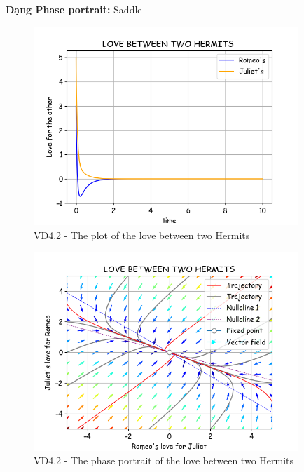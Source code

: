 \textbf{Dạng Phase portrait: } Saddle
\pagebreak
\begin{figure}[!htbp]
    \centering
    \includegraphics[width=100mm]{image/bt2/plot4.2.png}
    \caption{VD4.2 - The plot of the love between two Hermits}
\end{figure}
\begin{figure}[!htbp]
    \centering
    \includegraphics[width=100mm]{image/bt2/pp4.2.png}
    \caption{VD4.2 - The phase portrait of the love between two Hermits}
\end{figure}

